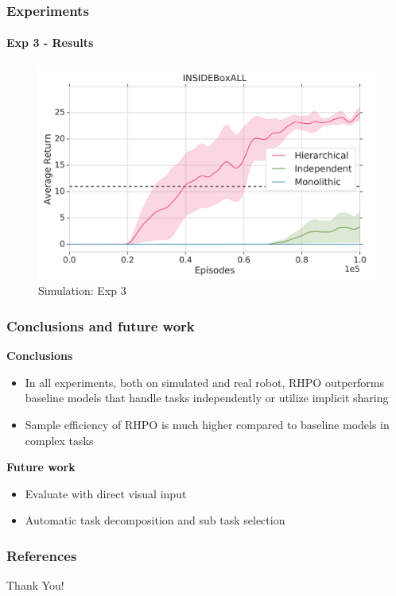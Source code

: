 \documentclass{beamer}
\begin{document}
\begin{frame}
	\frametitle{Experiments}
	\framesubtitle{Exp 3 - Results}
	
	\begin{figure}[!h]
		\caption{Simulation: Exp 3}
		\includegraphics[scale=0.2]{sim-r3.png}
	\end{figure}
\end{frame}


\begin{frame}
	\frametitle{Conclusions and future work}
	
	\textbf{Conclusions}
	\begin{itemize}
		\item In all experiments, both on simulated and real robot, RHPO outperforms baseline models that handle tasks independently or utilize implicit sharing
		\item Sample efficiency of RHPO is much higher compared to baseline models in complex tasks
	\end{itemize}

	\textbf{Future work}
	\begin{itemize}
		\item Evaluate with direct visual input
		\item Automatic task decomposition and sub task selection
	\end{itemize}

	\nocite{abdolmaleki2018maximum} \nocite{riedmiller2018learning} \nocite{wulfmeier2019regularized}
\end{frame}


\begin{frame}
\frametitle{References}


\end{frame}


\begin{frame}
\Huge{\centerline{Thank You!}}
\end{frame}

\end{document}
